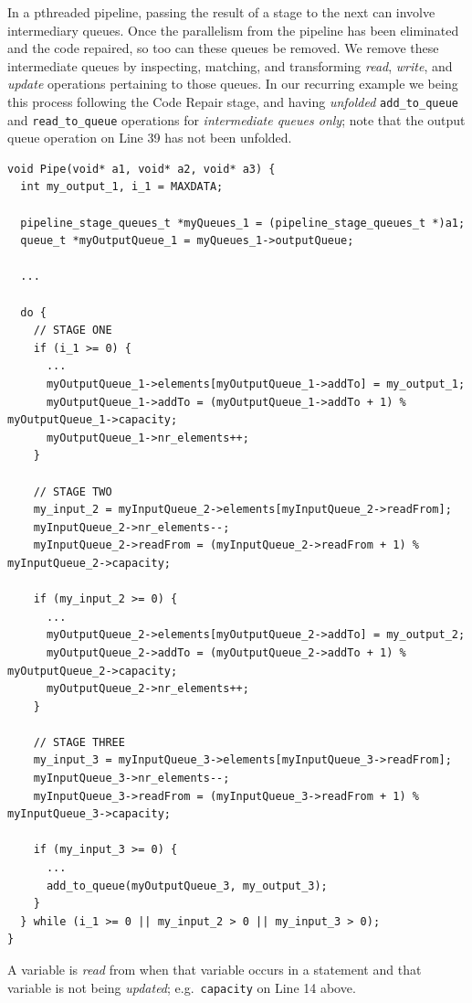 In a pthreaded pipeline, passing the result of a stage to the next can involve intermediary queues. Once the parallelism from the pipeline has been eliminated and the code repaired, so too can these queues be removed.
%
%
We remove these intermediate queues by inspecting, matching, and transforming \emph{read}, \emph{write}, and \emph{update} operations pertaining to those queues.
%
In our recurring example we being this process following the Code Repair stage, and having \emph{unfolded} \lstinline|add_to_queue| and \lstinline|read_to_queue| operations for \emph{intermediate queues only}; note that the output queue operation on Line 39 has not been unfolded.
%
\begin{lstlisting}
void Pipe(void* a1, void* a2, void* a3) {
  int my_output_1, i_1 = MAXDATA;
  
  pipeline_stage_queues_t *myQueues_1 = (pipeline_stage_queues_t *)a1;
  queue_t *myOutputQueue_1 = myQueues_1->outputQueue;

  ...

  do {
    // STAGE ONE
    if (i_1 >= 0) { 
      ...
      myOutputQueue_1->elements[myOutputQueue_1->addTo] = my_output_1;
      myOutputQueue_1->addTo = (myOutputQueue_1->addTo + 1) % myOutputQueue_1->capacity;
      myOutputQueue_1->nr_elements++;
    }

    // STAGE TWO
    my_input_2 = myInputQueue_2->elements[myInputQueue_2->readFrom];
    myInputQueue_2->nr_elements--;
    myInputQueue_2->readFrom = (myInputQueue_2->readFrom + 1) % myInputQueue_2->capacity;

    if (my_input_2 >= 0) {
      ...
      myOutputQueue_2->elements[myOutputQueue_2->addTo] = my_output_2;
      myOutputQueue_2->addTo = (myOutputQueue_2->addTo + 1) % myOutputQueue_2->capacity;
      myOutputQueue_2->nr_elements++;
    }
    
    // STAGE THREE
    my_input_3 = myInputQueue_3->elements[myInputQueue_3->readFrom];
    myInputQueue_3->nr_elements--;
    myInputQueue_3->readFrom = (myInputQueue_3->readFrom + 1) % myInputQueue_3->capacity;
    
    if (my_input_3 >= 0) {
      ...
      add_to_queue(myOutputQueue_3, my_output_3);
    }
  } while (i_1 >= 0 || my_input_2 > 0 || my_input_3 > 0);
}
\end{lstlisting}
%
A variable is \emph{read} from when that variable occurs in a statement and that variable is not being \emph{updated}; e.g.\ \lstinline|capacity| on Line 14 above.
